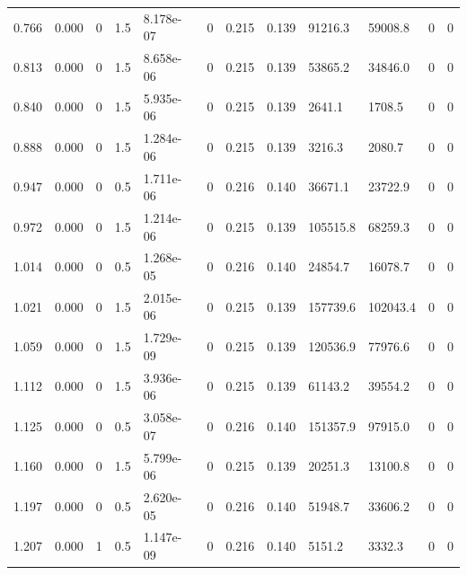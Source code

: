 \documentclass[preview]{standalone}
\begin{document}
{{\begin{tabular}{L{1.2cm}C{1.2cm} C{0.3cm}C{0.5cm} C{1.4cm}C{1.4cm} C{1.4cm}C{1.4cm} C{1.6cm}C{1.6cm} C{1.6cm}C{1.6cm}}
  0.766  &  0.000  & 0     & 1.5 &  8.178e-07  & 0  &  0.215&   0.139& 91216.3 & 59008.8   &  0 & 0  \\ 
  0.813  &  0.000  & 0     & 1.5 &  8.658e-06  & 0  &  0.215&   0.139& 53865.2 & 34846.0   &  0 & 0  \\ 
  0.840  &  0.000  & 0     & 1.5 &  5.935e-06  & 0  &  0.215&   0.139& 2641.1 & 1708.5   &  0 & 0  \\ 
  0.888  &  0.000  & 0     & 1.5 &  1.284e-06  & 0  &  0.215&   0.139& 3216.3 & 2080.7   &  0 & 0  \\ 
  0.947  &  0.000  & 0     & 0.5 &  1.711e-06  & 0  &  0.216&   0.140& 36671.1 & 23722.9   &  0 & 0  \\ 
  0.972  &  0.000  & 0     & 1.5 &  1.214e-06  & 0  &  0.215&   0.139& 105515.8 & 68259.3   &  0 & 0  \\ 
  1.014  &  0.000  & 0     & 0.5 &  1.268e-05  & 0  &  0.216&   0.140& 24854.7 & 16078.7   &  0 & 0  \\ 
  1.021  &  0.000  & 0     & 1.5 &  2.015e-06  & 0  &  0.215&   0.139& 157739.6 & 102043.4   &  0 & 0  \\ 
  1.059  &  0.000  & 0     & 1.5 &  1.729e-09  & 0  &  0.215&   0.139& 120536.9 & 77976.6   &  0 & 0  \\ 
  1.112  &  0.000  & 0     & 1.5 &  3.936e-06  & 0  &  0.215&   0.139& 61143.2 & 39554.2   &  0 & 0  \\ 
  1.125  &  0.000  & 0     & 0.5 &  3.058e-07  & 0  &  0.216&   0.140& 151357.9 & 97915.0   &  0 & 0  \\ 
  1.160  &  0.000  & 0     & 1.5 &  5.799e-06  & 0  &  0.215&   0.139& 20251.3 & 13100.8   &  0 & 0  \\ 
  1.197  &  0.000  & 0     & 0.5 &  2.620e-05  & 0  &  0.216&   0.140& 51948.7 & 33606.2   &  0 & 0  \\ 
  1.207  &  0.000  & 1     & 0.5 &  1.147e-09  & 0  &  0.216&   0.140& 5151.2 & 3332.3   &  0 & 0  \\ 
\hline 
\end{tabular} 

}}
\end{document}
